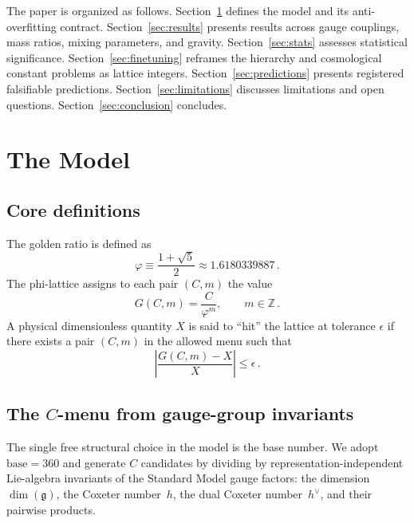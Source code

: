 \documentclass[12pt,a4paper]{article}
\newcommand{\vp}{\varphi}
\begin{document}
The paper is organized as follows.  Section~\ref{sec:model} defines the model
and its anti-overfitting contract.  Section~\ref{sec:results} presents results
across gauge couplings, mass ratios, mixing parameters, and gravity.
Section~\ref{sec:stats} assesses statistical significance.
Section~\ref{sec:finetuning} reframes the hierarchy and cosmological constant
problems as lattice integers.  Section~\ref{sec:predictions} presents
registered falsifiable predictions.  Section~\ref{sec:limitations} discusses
limitations and open questions.  Section~\ref{sec:conclusion} concludes.


\section{The Model}
\label{sec:model}

\subsection{Core definitions}
\label{sec:core}

The golden ratio is defined as
\begin{equation}
  \vp \equiv \frac{1+\sqrt{5}}{2} \approx 1.6180339887\,.
\end{equation}
The phi-lattice assigns to each pair $(C, m)$ the value
\begin{equation}
  G(C,m) = \frac{C}{\vp^m}, \qquad m \in \mathbb{Z}\,.
  \label{eq:lattice_def}
\end{equation}
A physical dimensionless quantity $X$ is said to ``hit'' the lattice at
tolerance $\epsilon$ if there exists a pair $(C,m)$ in the allowed menu such
that
\begin{equation}
  \left|\frac{G(C,m) - X}{X}\right| \le \epsilon\,.
\end{equation}

\subsection{The $C$-menu from gauge-group invariants}
\label{sec:cmenu}

The single free structural choice in the model is the base number.  We adopt
$\mathrm{base} = 360$ and generate $C$ candidates by dividing by
representation-independent Lie-algebra invariants of the Standard Model gauge
factors: the dimension $\dim(\mathfrak{g})$, the Coxeter number~$h$, the dual
Coxeter number~$h^\vee$, and their pairwise products.
\end{document}
